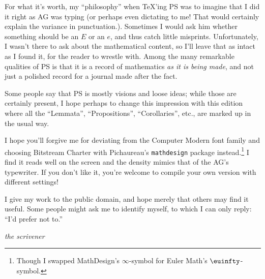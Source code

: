 For what it's worth, my ``philosophy'' when \TeX 'ing PS was to
imagine that I did it right as AG was typing (or perhaps even
dictating to me! That would certainly explain the variance in
punctuation.). Sometimes I would ask him whether something should be
an $E$ or an $e$, and thus catch little misprints. Unfortunately, I
wasn't there to ask about the mathematical content, so I'll leave that
as intact as I found it, for the reader to wrestle with. Among the
many remarkable qualities of PS is that it is a record of mathematics
\emph{as it is being made}, and not just a polished record for a
journal made after the fact.

Some people say that PS is mostly visions and loose ideas; while those
are certainly present, I hope perhaps to change this impression with
this edition where all the ``Lemmata'', ``Propositions'',
``Corollaries'', etc., are marked up in the usual way.

I hope you'll forgive me for deviating from the Computer Modern font
family and choosing Bitstream Charter with Pichaureau's
\texttt{mathdesign} package instead.\footnote{Though I swapped
  MathDesign's $\infty$-symbol for Euler Math's $\euinfty$-symbol.} I
find it reads well on the screen and the density mimics that of the
AG's typewriter. If you don't like it, you're welcome to compile your
own version with different settings!

I give my work to the public domain, and hope merely that others may
find it useful. Some people might ask me to identify myself, to which
I can only reply: ``I'd prefer not to.''

\bigskip
\noindent\hfill\emph{the scrivener}\par

